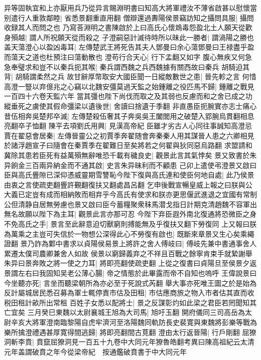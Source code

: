 异等固執宜和上亦厭用兵乃從异言賜淵明書曰知高大將軍禮汝不薄省啟甚以慰懷當别遣行人重敦鄰睦|{
	省悉景翻重直用翻}
僧辯還過夀陽侯景竊訪知之攝問具服|{
	攝問收録其人而問之也}
乃寫荅淵明之書陳啟於上曰高氏心懷鴆毒怨盈北土人願天從歡身殞越|{
	謂人所祝願天從而殺之}
子澄嗣惡計滅待時所以昧此一勝者|{
	謂渦陽之勝也}
盖天蕩澄心以盈凶毒耳|{
	左傳楚武王將死告其夫人鄧曼曰余心蕩鄧曼曰王禄盡乎盈而蕩天之道也杜預注曰蕩動散也}
澄苟行合天心|{
	行下孟翻又如字}
腹心無疾又何急急奉璧求和豈不以秦兵扼其喉|{
	秦兵謂西魏之兵西魏據有關西故曰秦兵}
胡騎迫其背|{
	胡騎謂柔然之兵}
故甘辭厚幣取安大國臣聞一日縱敵數世之患|{
	晉先軫之言}
何惜高澄一豎以弃億兆之心竊以北魏安彊莫過天監之始鍾離之役匹馬不歸|{
	鍾離之戰見一百四十六卷天監六年}
當其彊也陛下尚伐而取之及其弱也反慮而和之舍已成之功縱垂死之虜使其假命彊梁以遺後世|{
	舍讀曰捨遺于季翻}
非直愚臣扼腕實亦志士痛心昔伍相奔吳楚邦卒滅|{
	左傳楚殺伍奢其子奔吳吳王闔閭用之破楚入郢腕烏貫翻相息亮翻卒子恤翻}
陳平去項劉氏用興|{
	見漢高帝紀}
臣雖才劣古人心同往事誠知高澄忌賈在翟惡會居秦|{
	左傳晉靈公之初賈季奔翟随會奔秦秦人用其謀晉人患之六卿相見於諸浮趙宣子曰隨會在秦賈季在翟難日至矣將若之何翟與狄同惡烏路翻}
求盟請和冀除其患若臣死有益萬殞無辭唯恐千載有穢良史|{
	觀景此言其氣悖矣}
景又致書於朱异餉金三百兩异納金而不通其啟|{
	史言朱异昧利而不顧患}
己卯上遣使弔澄景又啟曰臣與高氏舋隙已深仰憑威靈期雪讐恥今陛下復與高氏連和使臣何地自處|{
	此乃侯景由衷之言使疏吏翻舋許覲翻復扶又翻處昌呂翻}
乞申後戰宣暢皇威上報之曰朕與公大義已定豈有成而相納敗而相弃乎今高氏有使求和朕亦更思偃武進退之宜國有常制公但清静自居無勞慮也景又啟曰臣今蓄糧聚衆秣馬潜戈指日計期克清趙魏不容軍出無名故願以陛下為主耳|{
	觀景此言亦那可忍}
今陛下弃臣遐外南北復通將恐微臣之身不免高氏之手|{
	景言至此辭意迫切獸窮則搏能無及乎復扶又翻下勞復同}
上又報曰朕為萬乘之主豈可失信於一物想公深得此心不勞復有啟也|{
	既斷來章景又生心矣乘繩證翻}
景乃詐為鄴中書求以貞陽侯易景上將許之舍人傅岐曰|{
	傅岐先兼中書通事舍人累遷太僕司農卿兼舍人如故}
侯景以窮歸義弃之不祥且百戰之餘寧肯束手就縶謝舉朱异曰景奔敗之將一使之力耳|{
	將即亮翻使疏吏翻}
上從之復書曰貞陽旦至侯景夕返景謂左右曰我固知吴老公薄心腸|{
	帝之情態於此畢露而帝不自知也嗚呼}
王偉說景曰今坐聽亦死|{
	言坐而聽梁朝所為亦必至于死說式芮翻}
舉大事亦死唯王圖之於是始為反計屬城居民悉召募為軍士輒停責市估及田租|{
	市估應商旅之物入市者估其直而收税田租計畝所出常租}
百姓子女悉以配將士|{
	景之反謀彰灼如此梁之君臣若罔聞知其亡宜矣}
三月癸巳東魏以太尉襄城王旭為大司馬|{
	旭吁玉翻}
開府儀同三司高岳為太尉辛亥大將軍澄南臨黎陽自虎牢濟河至洛陽魏同軌防長史裴寛與東魏將彭樂等戰為樂所擒澄禮遇甚厚寛得間逃歸|{
	將即亮翻間古莧翻}
澄由太行返晉陽|{
	行戶剛翻}
屈獠洞斬李賁|{
	賁竄屈獠洞見一百五十九卷中大同元年獠魯皓翻考異曰陳高祖紀云太清元年盖謂破賁之年今從梁帝紀　按通鑑破賁書于中大同元年}
